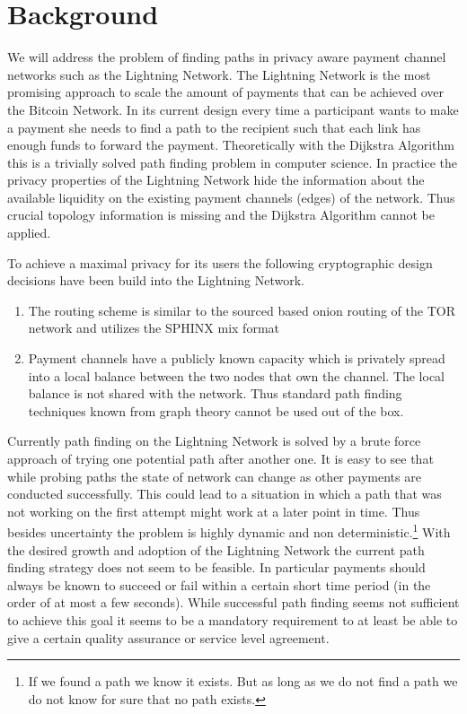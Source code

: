 \documentclass[a4paper]{paper}
\begin{document}
\section{Background}
We will address the problem of finding paths in privacy aware payment channel networks such as the Lightning Network.
The Lightning Network is the most promising approach to scale the amount of payments that can be achieved over the Bitcoin Network.
In its current design every time a participant wants to make a payment she needs to find a path to the recipient such that each link has enough funds to forward the payment.
Theoretically with the Dijkstra Algorithm this is a trivially solved path finding problem in computer science.
In practice the privacy properties of the Lightning Network hide the information about the available liquidity on the existing payment channels (edges) of the network.
Thus crucial topology information is missing and the Dijkstra Algorithm cannot be applied.

To achieve a maximal privacy for its users the following cryptographic design decisions have been build into the Lightning Network.
\begin{enumerate}
\item The routing scheme is similar to the sourced based onion routing of the TOR network and utilizes the SPHINX mix format \cite{danezis2009sphinx}
\item Payment channels have a publicly known capacity which is privately spread into a local balance between the two nodes that own the channel. The local balance is not shared with the network. Thus standard path finding techniques known from graph theory cannot be used out of the box.
\end{enumerate}

Currently path finding on the Lightning Network is solved by a brute force approach of trying one potential path after another one.
It is easy to see that while probing paths the state of network can change as other payments are conducted successfully.
This could lead to a situation in which a path that was not working on the first attempt might work at a later point in time.
Thus besides uncertainty the problem is highly dynamic and non deterministic.\footnote{If we found a path we know it exists. But as long as we do not find a path we do not know for sure that no path exists.}
With the desired growth and adoption of the Lightning Network the current path finding strategy does not seem to be feasible.
In particular payments should always be known to succeed or fail within a certain short time period (in the order of at most a few seconds).
While successful path finding seems not sufficient to achieve this goal it seems to be a mandatory requirement to at least be able to give a certain quality assurance or service level agreement.
\end{document}
